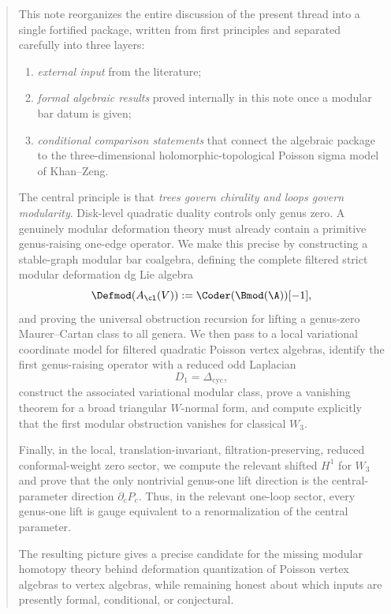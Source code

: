 \label{ch:modular-pva-quantization}

\begin{abstract}
This note reorganizes the entire discussion of the present thread into a single fortified
package, written from first principles and separated carefully into three layers:

\begin{enumerate}[label=\textnormal{(\roman*)},leftmargin=2.6em]
\item \emph{external input} from the literature;
\item \emph{formal algebraic results} proved internally in this note once a modular bar datum is given;
\item \emph{conditional comparison statements} that connect the algebraic package to the
three-dimensional holomorphic-topological Poisson sigma model of Khan--Zeng.
\end{enumerate}

The central principle is that \emph{trees govern chirality and loops govern modularity}.
Disk-level quadratic duality controls only genus zero. A genuinely modular deformation
theory must already contain a primitive genus-raising one-edge operator. We make this
precise by constructing a stable-graph modular bar coalgebra, defining the complete
filtered strict modular deformation dg Lie algebra
\[
\Defmod(A_{\cl}(V)) := \Coder(\Bmod(\A))[-1],
\]
and proving the universal obstruction recursion for lifting a genus-zero Maurer--Cartan
class to all genera. We then pass to a local variational coordinate model for filtered
quadratic Poisson vertex algebras, identify the first genus-raising operator with a reduced
odd Laplacian
\[
D_1=\Delta_{\mathrm{cyc}},
\]
construct the associated variational modular class, prove a vanishing theorem for a broad
triangular $W$-normal form, and compute explicitly that the first modular obstruction
vanishes for classical $W_3$.

Finally, in the local, translation-invariant, filtration-preserving, reduced conformal-weight
zero sector, we compute the relevant shifted $H^1$ for $W_3$ and prove that the only
nontrivial genus-one lift direction is the central-parameter direction $\partial_c P_c$.
Thus, in the relevant one-loop sector, every genus-one lift is gauge equivalent to a
renormalization of the central parameter.

The resulting picture gives a precise candidate for the missing modular homotopy theory
behind deformation quantization of Poisson vertex algebras to vertex algebras, while
remaining honest about which inputs are presently formal, conditional, or conjectural.
\end{abstract}

